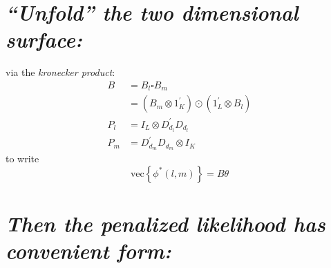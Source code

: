 \documentclass[12pt]{article}
\newcommand{\ms}{\scriptscriptstyle}
\theoremstyle{definition}
\begin{document}
%
%
%

 





 
\section{\emph{``Unfold'' the two dimensional surface:}}

via the \emph{kronecker product}:
\begin{align*} %
B &= B_l \square B_m \\
&= \left( B_m \otimes 1^\prime_{K} \right) \odot \left(1^\prime_{L} \otimes  B_l  \right)\\
P_l  &=  I_L \otimes D_{d_{\ms l}}^\prime D_{d_{\ms l}}\\
P_m &=   D_{d_{\ms m}}^\prime D_{d_{\ms m}} \otimes I_K
\end{align*}
to write
\begin{equation*}
\mbox{vec}\left\{ \phi^*\left(l,m\right)\right \} = B \theta
\end{equation*}

 




 
\section{\emph{Then the penalized likelihood has convenient form:}}
\end{document}
